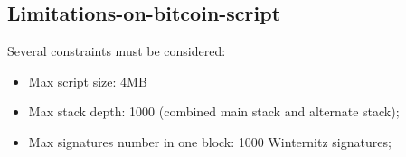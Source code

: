 \subsection{Limitations-on-bitcoin-script}

Several constraints must be considered:
\begin{itemize}
    \item Max script size: 4MB
    \item Max stack depth: 1000 (combined main stack and alternate stack);
    \item Max signatures number in one block: 1000 Winternitz signatures;
\end{itemize}
